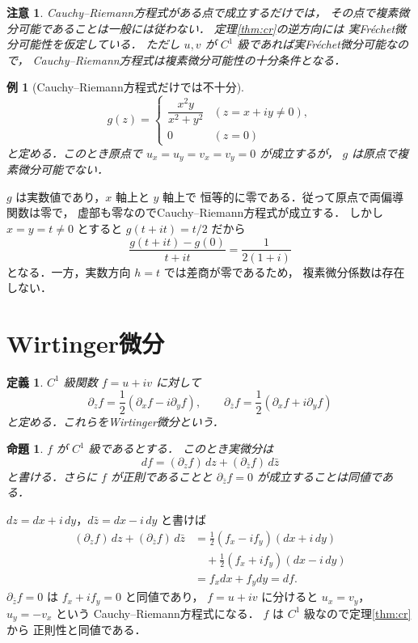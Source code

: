 \documentclass[a5paper,10pt,onecolumn]{jsarticle}
\makeatletter
\theoremstyle{mathnotetheorem}
\newtheorem{definition}[theorem]{定義}
\newtheorem{proposition}[theorem]{命題}
\newtheorem{example}[theorem]{例}
\newtheorem{remark}[theorem]{注意}
\renewcommand{\proofname}{証明}
\renewenvironment{proof}[1][\proofname]{%
  \par\pushQED{\qed}\normalfont\topsep4\p@\@plus2\p@\relax
  \trivlist\item[\hskip\labelsep\bfseries #1]\ignorespaces
}{\popQED\endtrivlist\@endpefalse}
\makeatother
\begin{document}
\begin{remark}
Cauchy--Riemann方程式がある点で成立するだけでは，
その点で複素微分可能であることは一般には従わない．
定理\ref{thm:cr}の逆方向には
\emph{実Fr\'echet微分可能性}を仮定している．
ただし $u,v$ が $C^1$ 級であれば実Fr\'echet微分可能なので，
Cauchy--Riemann方程式は複素微分可能性の十分条件となる．
\end{remark}

\begin{example}[Cauchy--Riemann方程式だけでは不十分]
\[
 g(z)=
 \begin{cases}
 \dfrac{x^2y}{x^2+y^2}&(z=x+iy\ne0),\\
 0&(z=0)
 \end{cases}
\]
と定める．このとき原点で
$u_x=u_y=v_x=v_y=0$ が成立するが，
$g$ は原点で複素微分可能でない．
\end{example}
\begin{proof}
$g$ は実数値であり，$x$ 軸上と $y$ 軸上で
恒等的に零である．従って原点で両偏導関数は零で，
虚部も零なのでCauchy--Riemann方程式が成立する．
しかし $x=y=t\ne0$ とすると
$g(t+it)=t/2$ だから
\[
 \frac{g(t+it)-g(0)}{t+it}=\frac1{2(1+i)}
\]
となる．一方，実数方向 $h=t$ では差商が零であるため，
複素微分係数は存在しない．
\end{proof}

\section{Wirtinger微分}

\begin{definition}
$C^1$ 級関数 $f=u+iv$ に対して
\[
 \partial_zf=\frac12(\partial_xf-i\partial_yf),
 \qquad
 \partial_{\bar z}f=\frac12(\partial_xf+i\partial_yf)
\]
と定める．これらをWirtinger微分という．
\end{definition}

\begin{proposition}\label{prop:wirtinger}
$f$ が $C^1$ 級であるとする．
このとき実微分は
\[
 df=(\partial_zf)\,dz+(\partial_{\bar z}f)\,d\bar z
\]
と書ける．さらに $f$ が正則であることと
$\partial_{\bar z}f=0$ が成立することは同値である．
\end{proposition}
\begin{proof}
$dz=dx+i\,dy$，$d\bar z=dx-i\,dy$ と書けば
\begin{align*}
 (\partial_zf)\,dz+(\partial_{\bar z}f)\,d\bar z
 &=\tfrac12(f_x-if_y)(dx+i\,dy)\\
 &\quad+\tfrac12(f_x+if_y)(dx-i\,dy)\\
 &=f_xdx+f_ydy=df.
\end{align*}
$\partial_{\bar z}f=0$ は $f_x+if_y=0$ と同値であり，
$f=u+iv$ に分けると
$u_x=v_y$，$u_y=-v_x$ という
Cauchy--Riemann方程式になる．
$f$ は $C^1$ 級なので定理\ref{thm:cr}から
正則性と同値である．
\end{proof}
\end{document}

